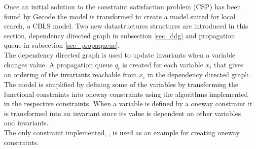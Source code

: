 Once an initial solution to the constraint satisfaction problem (CSP) has been found by Gecode the model is transformed 
to create a model suited for local search, a CBLS model. Two new datastructures structures are introduced in this 
section, dependency directed graph in subsection \ref{sec_ddg} and propagation queue in subsection \ref{sec_propaqueue}. 
\\
The dependency directed graph is used to update invariants when a variable changes value. A 
propagation queue $q_i$ is created for each variable $x_i$ that gives an ordering of the invariants reachable from 
$x_i$ in the dependency directed graph. \\
The model is simplified by defining some of the variables by transforming the functional constraints into oneway 
constraints using the algorithms implemented in the respective constraints. When a variable is defined by a oneway 
constraint it is transformed into an invariant since its value is dependent on other variables and invariants. \\ 
The only constraint implemented, , is used as an example for creating oneway constraints. 
 